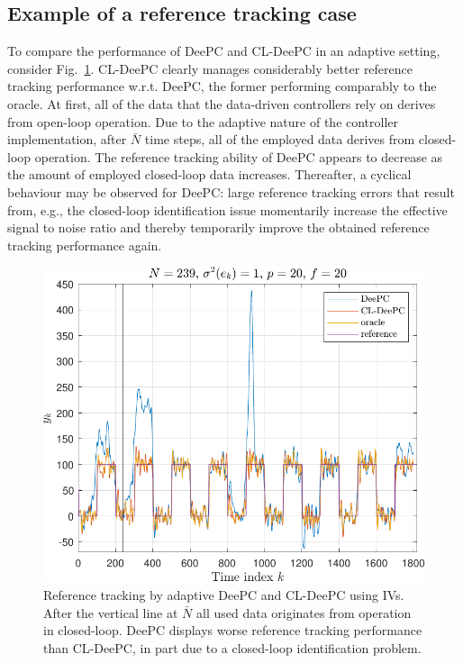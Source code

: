 \subsection{Example of a reference tracking case}
\noindent To compare the performance of \ac{DeePC} and \ac{CL-DeePC} in an adaptive setting, consider Fig.~\ref{fig:CL_Problem_Solution}. \ac{CL-DeePC} clearly manages considerably better reference tracking performance w.r.t. \ac{DeePC}, the former performing comparably to the oracle. At first, all of the data that the data-driven controllers rely on derives from open-loop operation. Due to the adaptive nature of the controller implementation, after $\bar{N}$ time steps, all of the employed data derives from closed-loop operation. The reference tracking ability of \ac{DeePC} appears to decrease as the amount of employed closed-loop data increases. Thereafter, a cyclical behaviour may be observed for \ac{DeePC}: large reference tracking errors that result from, e.g., the closed-loop identification issue momentarily increase the effective signal to noise ratio and thereby temporarily improve the obtained reference tracking performance again.
\begin{figure}[t!]
\begin{center}%
\includegraphics[width=\columnwidth]{results/figures/DeePC_CL_ID_issue_Re_1_Nbar_239_p_20_f_20_Ru_1_Rdu_0_Q_100_R_0_dR_10.pdf}    %
\caption{Reference tracking by adaptive \ac{DeePC} and \ac{CL-DeePC} using \ac{IVs}. After the vertical line at $\bar{N}$ all used data originates from operation in closed-loop. \ac{DeePC} displays worse reference tracking performance than \ac{CL-DeePC}, in part due to a closed-loop identification problem.}%
\label{fig:CL_Problem_Solution}%
\end{center}%
\end{figure}%

